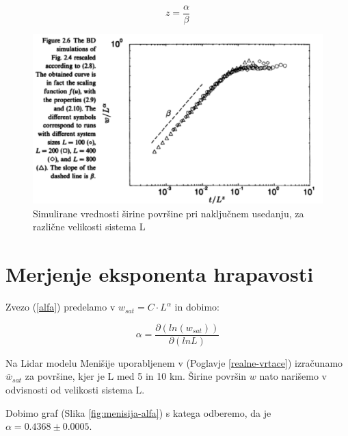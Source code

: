 \documentclass[a4paper, twoside, 12pt]{book}
\begin{document}
            \begin{equation}
              z = \frac{\alpha}{\beta}
            \end{equation}

            \begin{figure}[h]
              \begin{center}
                \includegraphics[width=12cm]{slike/barabasi}
              \end{center}
              \caption{Simulirane vrednosti širine površine pri naključnem usedanju, za različne velikosti sistema L \cite{barabasi1995fractal}}
              \label{fig:barabasi}
            \end{figure}



            \section{Merjenje eksponenta hrapavosti}
            \label{hrapavost}

            Zvezo (\ref{alfa}) predelamo  v $ w_{sat}=C \cdot L^\alpha $ in dobimo:

            \begin{equation}
              \alpha = \frac{\partial ( ln (w_{sat}) ) }{\partial ( ln L )}
              \label{alpha-numeric}
            \end{equation}

            Na Lidar modelu Menišije uporabljenem v (Poglavje \ref{realne-vrtace}) izračunamo $\bar{w}_{sat}$ za površine, kjer je L med 5 in 10 km. Širine površin $w$ nato narišemo v odvisnosti od velikosti sistema L.

            Dobimo graf (Slika \ref{fig:menisija-alfa}) s katega odberemo, da je $\alpha =  0.4368 \pm 0.0005$.
\end{document}
